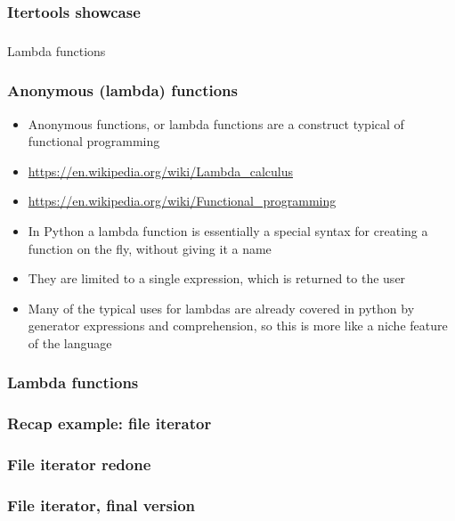 \documentclass[9pt]{beamer}
\begin{document}
\begin{frame}
  \frametitle{Itertools showcase}
  
\end{frame}


\begin{frame}
  \frametitle{}
  \centering \Large Lambda functions
\end{frame}


\begin{frame}
  \frametitle{Anonymous (lambda) functions}
  \begin{itemize}
    \item \alert{Anonymous functions}, or \alert{lambda functions} are a construct typical of \alert{functional programming}
    \item \url{https://en.wikipedia.org/wiki/Lambda_calculus}
    \item \url{https://en.wikipedia.org/wiki/Functional_programming}
    \item In Python a lambda function is essentially a special syntax for creating a function
          on the fly, without giving it a name
    \item They are limited to \alert{a single expression}, which is returned to the user
    \item Many of the typical uses for lambdas are already covered in python by generator expressions and comprehension,
          so this is more like a niche feature of the language
  \end{itemize}
  
\end{frame}


\begin{frame}
  \frametitle{Lambda functions}
  
\end{frame}


\begin{frame}
  \frametitle{Recap example: file iterator}
  
\end{frame}


\begin{frame}
  \frametitle{File iterator redone}
  
\end{frame}


\begin{frame}
  \frametitle{File iterator, final version}
  
\end{frame}
\end{document}
